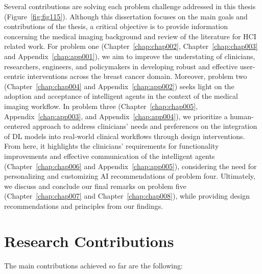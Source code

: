 Several contributions are solving each problem challenge addressed in this thesis (Figure~\ref{fig:fig115}).
Although this dissertation focuses on the main goals and contributions of the thesis, a critical objective is to provide information concerning the medical imaging background and review of the literature for \ac{HCI} related work.
For problem one (Chapter~\ref{chap:chap002}, Chapter~\ref{chap:chap003} and Appendix~\ref{chap:app001}), we aim to improve the understating of clinicians, researchers, engineers, and policymakers in developing robust and effective user-centric interventions across the breast cancer domain.
Moreover, problem two (Chapter~\ref{chap:chap004} and Appendix~\ref{chap:app002}) seeks light on the adoption and acceptance of intelligent agents in the context of the medical imaging workflow.
In problem three (Chapter~\ref{chap:chap005}, Appendix~\ref{chap:app003}, and Appendix~\ref{chap:app004}), we prioritize a human-centered approach to address clinicians' needs and preferences on the integration of \ac{DL} models into real-world clinical workflows through design interventions.
From here, it highlights the clinicians' requirements for functionality improvements and effective communication of the intelligent agents (Chapter~\ref{chap:chap006} and Appendix~\ref{chap:app005}), considering the need for personalizing and customizing \ac{AI} recommendations of problem four.
Ultimately, we discuss and conclude our final remarks on problem five (Chapter~\ref{chap:chap007} and Chapter~\ref{chap:chap008}), while providing design recommendations and principles from our findings.

\section{Research Contributions}
\label{sec:chap001005}

The main contributions achieved so far are the following:

